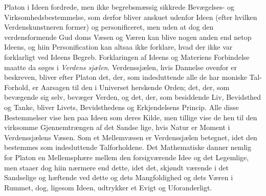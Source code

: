 \documentclass[12pt,a4paper]{book}
\begin{document}
Platon i Ideen fordrede, men ikke begrebsmæssig sikkrede
Bevægelses- og Virksomhedsbestemmelse, som derfor bliver
anskuet udenfor Ideen (efter hvilken Verdenskunstneren former)
og personificeret, men uden at dog den verdensformende Gud\-%
doms Væsen og Væren kan blive nogen anden end netop
Ideens, og hiin Personification kan altsaa ikke forklare, hvad
der ikke var forklarligt ved Ideens Begreb. Forklaringen af
Ideens og Materiens Forbindelse maatte da søges i \emph{Verdens\-%
sjælen}. Verdenssjælen, hvis Dannelse ovenfor er beskreven,
bliver efter Platon det, der, som indesluttende alle de har\-%
moniske Tal-Forhold, er Aarsagen til den i Universet herskende
Orden; det, der, som bevægende sig selv, bevæger Verden, og
det, der, som besiddende Liv, Bevidsthed og Tanke, bliver
Livets, Bevidsthedens og Erkjendelsens Princip. Alle disse
Bestemmelser vise hen paa Ideen som deres Kilde, men tillige
vise de hen til den virksomme Gjennemtrængen af det Sandse\-%
lige, hvis Natur er Moment i Verdenssjælens Væsen. Som et
Mellemvæsen er Verdenssjælen betegnet, idet den bestemmes
som indesluttende Talforholdene. Det Mathematiske danner
nemlig for Platon en Mellemsphære mellem den forsigværende
Idee og det Legemlige, men staaer dog hiin nærmere end
dette, idet det, skjøndt værende i det Sandselige og hæftende
ved dette og dets Mangfoldighed og dets Væren i Rummet,
dog, ligesom Ideen, udtrykker et Evigt og Uforanderligt.
\end{document}
